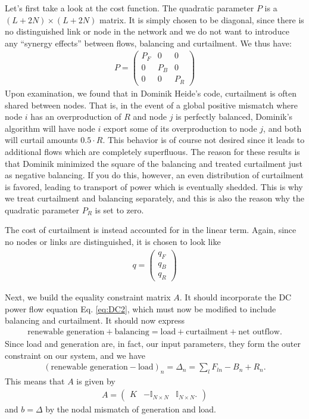 \documentclass[english,twoside,a4paper,11pt]{article}
\numberwithin{equation}{section}
\begin{document}
Let's first take a look at the cost function. The quadratic parameter
$P$ is a $(L+2N)\times(L+2N)$ matrix. It is simply chosen to be
diagonal, since there is no distinguished link or node in the network
and we do not want to introduce any ``synergy effects'' between flows,
balancing and curtailment. We thus have:
\begin{align*}
P=\left(
\begin{matrix}
P_F & 0 & 0 \\
0 & P_B & 0 \\
0 & 0 & P_R
\end{matrix}
\right)
\end{align*}
Upon examination, we found that in Dominik Heide's code, curtailment is
often shared between nodes. That is, in the event of a global positive
mismatch where node $i$ has an overproduction of $R$ and node $j$ is
perfectly balanced, Dominik's algorithm will have node $i$ export some
of its overproduction to node $j$, and both will curtail amounts
$0.5\cdot R$. This behavior is of course not desired since it leads to
additional flows which are completely superfluous. The reason for
these results is that Dominik minimized the square of the balancing
and treated curtailment just as negative balancing. If you do this,
however, an even distribution of curtailment is favored, leading to
transport of power which is eventually shedded. This is why we treat
curtailment and balancing separately, and this is also the reason why
the quadratic parameter $P_R$ is set to zero.

The cost of curtailment is instead accounted for in the linear
term. Again, since no nodes or links are distinguished, it is chosen
to look like
\begin{align*}
q=\left(
\begin{matrix}
q_F \\
q_B \\
q_R
\end{matrix}
\right)
\end{align*}

Next, we build the equality constraint matrix $A$. It should
incorporate the DC power flow equation Eq. \eqref{eq:DC2}, which must
now be modified to include balancing and curtailment. It should now
express
\begin{align*}
\text{renewable generation}+
\text{balancing}=\text{load}+\text{curtailment} + \text{net outflow}.
\end{align*}
Since load and generation are, in fact, our input parameters, they
form the outer constraint on our system, and we have
\begin{align*}
(\text{renewable generation}-\text{load})_n=\Delta_n
=\sum_l F_{ln}-B_n+R_n.
\end{align*}
This means that $A$ is given by
\begin{align*}
A=\left(
\begin{matrix}
K & -\mathbb{I}_{N\times N} & \mathbb{I}_{N\times N}.
\end{matrix}
\right)
\end{align*}
and $b=\Delta$ by the nodal mismatch of generation and load.
\end{document}

